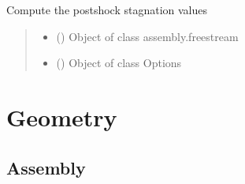 \documentclass[letterpaper,10pt,english]{sphinxmanual}
\begin{document}

\begin{fulllineitems}
\label{\detokenize{modules:mix_properties.compute_stagnation}}
\pysigstartsignatures
{}
\pysigstopsignatures
\sphinxAtStartPar
Compute the post\sphinxhyphen{}shock stagnation values
\begin{quote}\begin{description}
\begin{itemize}
\item {} 
\sphinxAtStartPar
{} ({\hyperref[\detokenize{modules:configuration.Freestream}]{}}) \textendash{} Object of class assembly.freestream

\item {} 
\sphinxAtStartPar
{} ({\hyperref[\detokenize{modules:configuration.Options}]{}}) \textendash{} Object of class Options

\end{itemize}

\end{description}\end{quote}

\end{fulllineitems}



\section{Geometry}
\label{\detokenize{modules:geometry}}

\subsection{Assembly}
\label{\detokenize{modules:assembly}}
\end{document}
